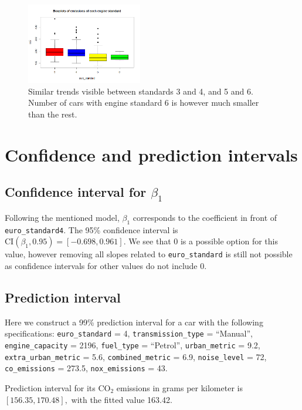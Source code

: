 \documentclass[12pt]{article}
\begin{document}
\begin{figure}[h!]
  \centering
  \includegraphics[width=0.45\textwidth]{project3/boxplots.png}
  \caption{Similar trends visible between standards 3 and 4, and 5 and 6. Number of cars with engine standard 6 is however much smaller
  than the rest.}
  \label{fig:boxplotEuroStd}
\end{figure}

\section{Confidence and prediction intervals}

\subsection{Confidence interval for $\beta_1$}
Following the mentioned model, $\beta_1$ corresponds to the coefficient in front of \texttt{euro\_standard4}. The 95\% confidence
interval is $\text{CI}(\beta_{1},0.95) = [-0.698,0.961].$
We see that 0 is a possible option for this value, however removing all slopes related to \texttt{euro\_standard} is still not possible 
as confidence intervals for other values do not include 0.

\subsection{Prediction interval}
Here we construct a 99\% prediction interval for a car with the following specifications: \texttt{euro\_standard} = 4, \texttt{transmission\_type}
= ``Manual'', \texttt{engine\_capacity} = 2196, \texttt{fuel\_type} = ``Petrol'', \texttt{urban\_metric} =
9.2, \texttt{extra\_urban\_metric} = 5.6, \texttt{combined\_metric} = 6.9, \texttt{noise\_level} = 72, \texttt{co\_emissions}
= 273.5, \texttt{nox\_emissions} = 43. 

Prediction interval for its $\text{CO}_2$ emissions in grams per kilometer is $[156.35,170.48],$ with the fitted value 163.42.
\end{document}
